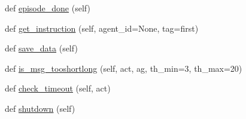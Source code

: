 \begin{DoxyCompactItemize}
def \hyperlink{classprojects_1_1wizard__of__wikipedia_1_1mturk__evaluation__task_1_1worlds_1_1WizardEval_a858503006ae3bd8583cecb008a0eb522}{episode\+\_\+done} (self)
\item 
def \hyperlink{classprojects_1_1wizard__of__wikipedia_1_1mturk__evaluation__task_1_1worlds_1_1WizardEval_aa58e1bc16ad0db719e00321563c9f45a}{get\+\_\+instruction} (self, agent\+\_\+id=None, tag=\textquotesingle{}first\textquotesingle{})
\item 
def \hyperlink{classprojects_1_1wizard__of__wikipedia_1_1mturk__evaluation__task_1_1worlds_1_1WizardEval_af2db699f6af0f8b441fbf280c5b12302}{save\+\_\+data} (self)
\item 
def \hyperlink{classprojects_1_1wizard__of__wikipedia_1_1mturk__evaluation__task_1_1worlds_1_1WizardEval_ac6b1cd76a8d7270fb0d879c2ec77abf5}{is\+\_\+msg\+\_\+tooshortlong} (self, act, ag, th\+\_\+min=3, th\+\_\+max=20)
\item 
def \hyperlink{classprojects_1_1wizard__of__wikipedia_1_1mturk__evaluation__task_1_1worlds_1_1WizardEval_a49e222b755af51462cba1320eadc4f53}{check\+\_\+timeout} (self, act)
\item 
def \hyperlink{classprojects_1_1wizard__of__wikipedia_1_1mturk__evaluation__task_1_1worlds_1_1WizardEval_aac0d10bb35f7764c2649773815969a5b}{shutdown} (self)
\end{DoxyCompactItemize}
